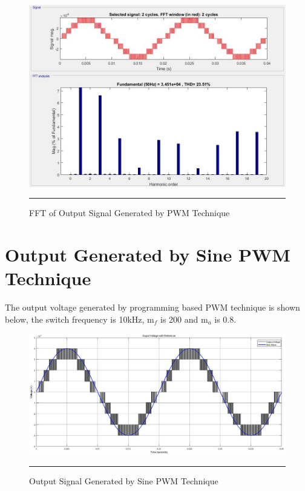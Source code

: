 \begin{figure}[htbp]
	\centering
	\includegraphics[width = 6in]{./Figures/Photos/Simulink/PWM_Out_FFT.jpg}
	\rule{35em}{1pt}
	\caption{FFT of Output Signal Generated by PWM Technique}
\end{figure}

\section{Output Generated by Sine PWM Technique}
The output voltage generated by programming based PWM technique is shown below, the switch frequency is 10kHz, m$_f$ is 200 and m$_a$ is 0.8.
\begin{figure}[htbp]
	\centering
	\includegraphics[width = 6in]{./Figures/Photos/Simulink/SPWM_Out.jpg}
	\rule{35em}{1pt}
	\caption{Output Signal Generated by Sine PWM Technique}
\end{figure}

